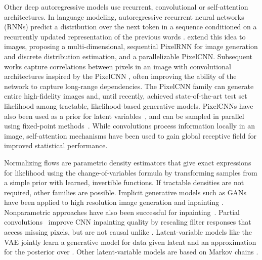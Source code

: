 \documentclass[letterpaper]{article}
\begin{document}
Other deep autoregressive models use recurrent, convolutional or self-attention architectures.
In language modeling, autoregressive recurrent neural networks (RNNs) predict a distribution over the next token in a sequence conditioned on a recurrently updated representation of the previous words \citep{mikolov2010recurrent}. \cite{oord2016pixel} extend this idea to images, proposing a multi-dimensional, sequential PixelRNN for image generation and discrete distribution estimation, and a parallelizable PixelCNN. 
Subsequent works capture correlations between pixels in an image with convolutional architectures inspired by the PixelCNN \citep{van2016conditional, salimans2017pixelcnnpp, menick2018generating, reed2017parallel}, often improving the ability of the network to capture long-range dependencies. The PixelCNN family can generate entire high-fidelity images and, until recently, achieved state-of-the-art test set likelihood among tractable, likelihood-based generative models. PixelCNNs have also been used as a prior for latent variables~\citep{van2017neural}, and can be sampled in parallel using fixed-point methods~\citep{song2020nonlinear, wiggers2020predictive}. While convolutions process information locally in an image, self-attention mechanisms have been used to gain global receptive field \citep{chen2017pixelsnail, parmar2018image, child2019generating} for improved statistical performance.

Normalizing flows \citep{rezende2015variational} are parametric density estimators that give exact expressions for likelihood using the change-of-variables formula by transforming samples from a simple prior with learned, invertible functions. If tractable densities are not required, other families are possible. Implicit generative models such as GANs \citep{goodfellow2014generative} have been applied to high resolution image generation \citep{karras2018progressive} and inpainting \citep{pathak2016context}. Nonparametric approaches have also been successful for inpainting~\citep{efros1999texture,Hays:2007, Barnes:2009:PAR}. Partial convolutions~\citep{liu2018partialinpainting} improve CNN inpainting quality by rescaling filter responses that access missing pixels, but are not causal unlike \ours{}. Latent-variable models like the VAE \citep{kingma2013auto, rezende2014stochastic} jointly learn a generative model for data  given latent  and an approximation for the posterior over . Other latent-variable models are based on Markov chains \citep{bengio2014deep, sohl2015deep, nijkamp2019learning}.
\end{document}
